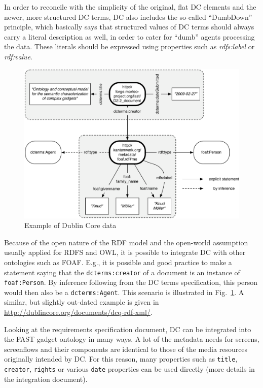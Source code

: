 \documentclass[twoside]{fast_latex}
\begin{document}
In order to reconcile with the simplicity of the original, flat DC elements and the newer, more structured DC terms, DC also includes the so-called ``DumbDown'' principle, which basically says that structured values of DC terms should always carry a literal description as well, in order to cater for ``dumb'' agents processing the data. These literals should be expressed using properties such as \emph{rdfs:label} or \emph{rdf:value}.

\begin{figure}
  \begin{center}
    \includegraphics[width=\linewidth]{images/dcterms_example.pdf}
    \caption{Example of Dublin Core data}
    \label{fig:dcterms_example}
  \end{center}
\end{figure}

Because of the open nature of the RDF model and the open-world assumption usually applied for RDFS and OWL, it is possible to integrate DC with other ontologies such as FOAF. E.g., it is possible and good practice to make a statement saying that the \texttt{dcterms:creator} of a document is an instance of \texttt{foaf:Person}. By inference following from the DC terms specification, this person would then also be a \texttt{dcterms:Agent}. This scenario is illustrated in Fig.~\ref{fig:dcterms_example}. A similar, but slightly out-dated example is given in \url{http://dublincore.org/documents/dcq-rdf-xml/}.

Looking at the requirements specification document, DC can be integrated into the FAST gadget ontology in many ways. A lot of the metadata needs for screens, screenflows and their components are identical to those of the media resources originally intended by DC. For this reason, many properties such as \texttt{title}, \texttt{creator}, \texttt{rights} or various \texttt{date} properties can be used directly (more details in the integration document). 
\end{document}

